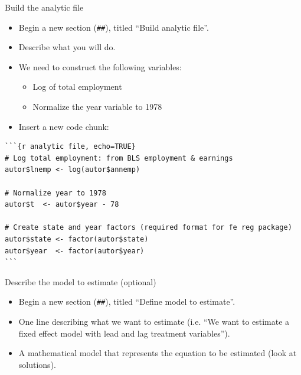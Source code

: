 \documentclass[ignorenonframetext,]{beamer}
\providecommand{\tightlist}{%
  \setlength{\itemsep}{0pt}\setlength{\parskip}{0pt}}
\begin{document}
\begin{frame}[fragile]{Build the analytic file}
\protect\hypertarget{build-the-analytic-file}{}

\begin{itemize}
\tightlist
\item
  Begin a new section (\texttt{\#\#}), titled ``Build analytic file''.\\
\item
  Describe what you will do.\\
\item
  We need to construct the following variables:

  \begin{itemize}
  \tightlist
  \item
    Log of total employment\\
  \item
    Normalize the year variable to 1978\\
  \end{itemize}
\item
  Insert a new code chunk:
\end{itemize}

\begin{verbatim}
```{r analytic file, echo=TRUE}
# Log total employment: from BLS employment & earnings
autor$lnemp <- log(autor$annemp)

# Normalize year to 1978
autor$t  <- autor$year - 78

# Create state and year factors (required format for fe reg package)
autor$state <- factor(autor$state)
autor$year  <- factor(autor$year)
```
\end{verbatim}

\end{frame}

\begin{frame}[fragile]{Describe the model to estimate (optional)}
\protect\hypertarget{describe-the-model-to-estimate-optional}{}

\begin{itemize}
\tightlist
\item
  Begin a new section (\texttt{\#\#}), titled ``Define model to
  estimate''.\\
\item
  One line describing what we want to estimate (i.e. ``We want to
  estimate a fixed effect model with lead and lag treatment
  variables'').\\
\item
  A mathematical model that represents the equation to be estimated
  (look at solutions).
\end{itemize}

\end{frame}
\end{document}
